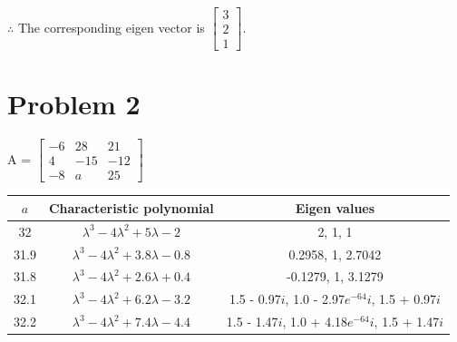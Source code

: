 \documentclass[12pt, a4paper]{article}
\begin{document}
$\therefore$ The corresponding eigen vector is $\begin{bmatrix}
    3 \\
    2 \\
    1
\end{bmatrix}$.

\newpage

\section*{Problem 2}

A = $\begin{bmatrix}
    -6 & 28 & 21 \\
    4 & -15 & -12 \\
    -8 & a & 25
\end{bmatrix}$

\begin{table}[h!]
    \begin{tabular}{ c  c  c }
   \hline
    $a$ & Characteristic polynomial & Eigen values \\
   \hline
    32 & $\lambda ^3 - 4\lambda ^2 + 5\lambda - 2$ & 2, 1, 1  \\
   31.9 & $\lambda ^3 - 4\lambda ^2 + 3.8\lambda - 0.8$ & 0.2958, 1, 2.7042   \\
   31.8 & $\lambda ^3 - 4\lambda ^2 + 2.6\lambda + 0.4$ & -0.1279, 1, 3.1279 \\
   32.1 & $\lambda ^3 - 4\lambda ^2 + 6.2\lambda - 3.2$ & 1.5 - 0.97$i$, 1.0 - 2.97$e^{-64}i$, 1.5 + 0.97$i$ \\
   32.2 & $\lambda ^3 - 4\lambda ^2 + 7.4\lambda - 4.4$ & 1.5 - 1.47$i$, 1.0 + 4.18$e^{-64}i$, 1.5 + 1.47$i$ \\
   \hline
    \end{tabular}
\end{table}
\end{document}
